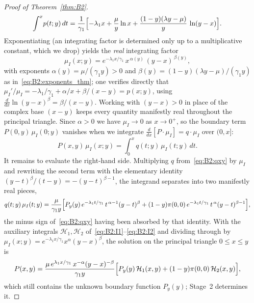 \begin{proof}[Proof of Theorem~\ref{thm:B2}]
\[
    \int^{x}\! p(t;y)\,dt
    = \frac{1}{\gamma_1}\Bigl[-\lambda_1 x + \frac{\mu}{y}\ln x
       + \frac{(1-y)(\lambda y-\mu)}{y}\,\ln(y-x)\Bigr].
\]
Exponentiating (an integrating factor is determined only up to a multiplicative constant,
which we drop) yields the \emph{real} integrating factor
\begin{equation}
    \mu_I(x;y) = e^{-\lambda_1 x/\gamma_1}\,x^{\,\alpha(y)}\,(y-x)^{\,\beta(y)},
    \label{eq:B2:mu_I}
\end{equation}
with exponents $\alpha(y)=\mu/(\gamma_1 y)>0$ and
$\beta(y)=(1-y)(\lambda y-\mu)/(\gamma_1 y)$ as in~\eqref{eq:B2:exponents_thm}; one verifies
directly that $\mu_I'/\mu_I = -\lambda_1/\gamma_1 + \alpha/x + \beta/(x-y) = p(x;y)$, using
$\tfrac{d}{dx}\ln(y-x)^{\beta}=\beta/(x-y)$. Working with $(y-x)>0$ in place of the complex
base $(x-y)$ keeps every quantity manifestly real throughout the principal triangle. Since
$\alpha>0$ we have $\mu_I\to0$ as $x\to0^{+}$, so the boundary term $P(0,y)\,\mu_I(0;y)$
vanishes when we integrate $\tfrac{d}{dx}[P\cdot\mu_I]=q\cdot\mu_I$ over $(0,x]$:
\begin{equation}
    P(x,y)\,\mu_I(x;y) = \int_0^x q(t;y)\,\mu_I(t;y)\,dt.
    \label{eq:B2:ODE_integral}
\end{equation}
It remains to evaluate the right-hand side. Multiplying $q$ from~\eqref{eq:B2:qxy} by
$\mu_I$ and rewriting the second term with the elementary identity
$(y-t)^{\beta}/(t-y)=-(y-t)^{\beta-1}$, the integrand separates into two manifestly real
pieces,
\begin{equation}
    q(t;y)\,\mu_I(t;y) = \frac{\mu}{\gamma_1 y}\Bigl[
        P_y(y)\,e^{-\lambda_1 t/\gamma_1}\,t^{\,\alpha-1}(y-t)^{\beta}
        + (1-y)\pi(0,0)\,e^{-\lambda_1 t/\gamma_1}\,t^{\,\alpha}(y-t)^{\beta-1}
    \Bigr],
    \label{eq:B2:integrand}
\end{equation}
the minus sign of~\eqref{eq:B2:qxy} having been absorbed by that identity. With the
auxiliary integrals $\mathcal{H}_1,\mathcal{H}_2$ of~\eqref{eq:B2:I1}--\eqref{eq:B2:I2} and
dividing through by $\mu_I(x;y)=e^{-\lambda_1 x/\gamma_1}x^{\alpha}(y-x)^{\beta}$, the
solution on the principal triangle $0\le x\le y$ is
\begin{equation}
    P(x,y) = \frac{\mu\,e^{\lambda_1 x/\gamma_1}\,x^{-\alpha}(y-x)^{-\beta}}{\gamma_1 y}
    \Bigl[P_y(y)\,\mathcal{H}_1(x,y) + (1-y)\pi(0,0)\,\mathcal{H}_2(x,y)\Bigr],
    \label{eq:B2:Pxy_real}
\end{equation}
which still contains the unknown boundary function $P_y(y)$; Stage~2 determines it.


\end{proof}
